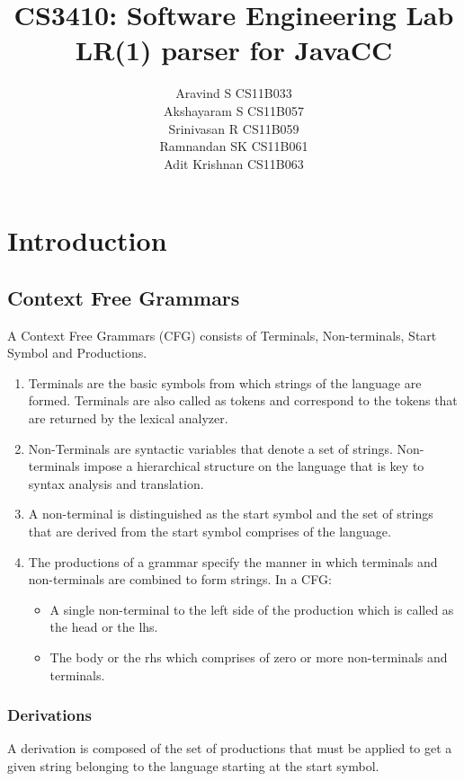 \documentclass[•]{book}
\begin{document}
\title{CS3410: Software Engineering Lab\\ LR(1) parser for JavaCC}
\author{Aravind S CS11B033\\
		Akshayaram S CS11B057 \\
		Srinivasan R CS11B059 \\
		Ramnandan SK CS11B061 \\
		Adit Krishnan CS11B063
}

\maketitle

\tableofcontents

\chapter{Introduction}
\section{Context Free Grammars}
A Context Free Grammars (CFG) consists of Terminals, Non-terminals, Start Symbol and Productions.
\begin{enumerate}
\item Terminals are the basic symbols from which strings of the language are formed. Terminals are also called as tokens and correspond to the tokens that are returned by the lexical analyzer.
\item Non-Terminals are syntactic variables that denote a set of strings. Non-terminals impose a hierarchical structure on the language that is key to syntax analysis and translation.
\item A non-terminal is distinguished as the start symbol and the set of strings that are derived from the start symbol comprises of the language.
\item The productions of a grammar specify the manner in which terminals and non-terminals are combined to form strings. In a CFG:
\begin{itemize}
\item A single non-terminal to the left side of the production which is called as the head or the lhs.
\item The body or the rhs which comprises of zero or more non-terminals and terminals.
\end{itemize} 
\end{enumerate}

\subsection{Derivations}
A derivation is composed of the set of productions that must be applied to get a given string belonging to the language starting at the start symbol.
\end{document}
